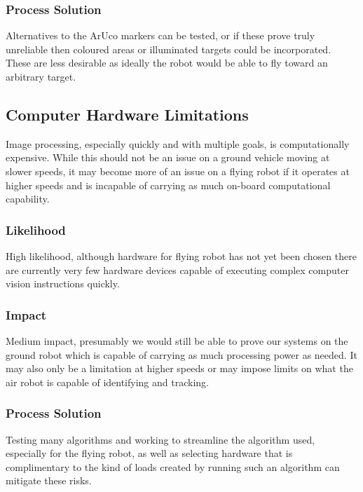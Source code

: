 \documentclass{article}
\begin{document}
		\subsubsection{Process Solution}
		
		Alternatives to the ArUco markers can be tested, or if these prove truly unreliable then coloured areas or illuminated targets could be incorporated. These are less desirable as ideally the robot would be able to fly toward an arbitrary target.
		
	\subsection{Computer Hardware Limitations}
	
	Image processing, especially quickly and with multiple goals, is computationally expensive. While this should not be an issue on a ground vehicle moving at slower speeds, it may become more of an issue on a flying robot if it operates at higher speeds and is incapable of carrying as much on-board computational capability.
	
		\subsubsection{Likelihood}
		
		High likelihood, although hardware for flying robot has not yet been chosen there are currently very few hardware devices capable of executing complex computer vision instructions quickly. 
		
		\subsubsection{Impact}
		
		Medium impact, presumably we would still be able to prove our systems on the ground robot which is capable of carrying as much processing power as needed. It may also only be a limitation at higher speeds or may impose limits on what the air robot is capable of identifying and tracking. 
		
		\subsubsection{Process Solution}
		
		Testing many algorithms and working to streamline the algorithm used, especially for the flying robot, as well as selecting hardware that is complimentary to the kind of loads created by running such an algorithm can mitigate these risks. 
	
\end{document}
